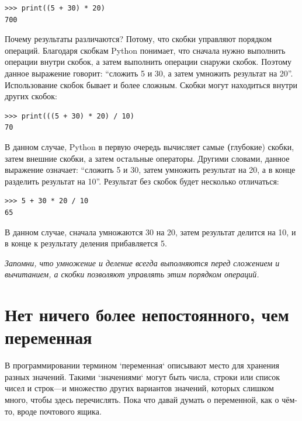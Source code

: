 \begin{listing}
\begin{verbatim}
>>> print((5 + 30) * 20)
700
\end{verbatim}
\end{listing}

\noindent
Почему результаты различаются? Потому, что скобки управляют порядком операций. Благодаря скобкам Python понимает, что сначала нужно выполнить операции внутри скобок, а затем выполнить операции снаружи скобок. Поэтому данное выражение говорит: ``сложить 5 и 30, а затем умножить результат на 20''.
Использование скобок бывает и более сложным. Скобки могут находиться внутри других скобок:

\begin{listing}
\begin{verbatim}
>>> print(((5 + 30) * 20) / 10)
70
\end{verbatim}
\end{listing}

\noindent
В данном случае, Python в первую очередь вычисляет самые \textbf(глубокие) скобки, затем внешние скобки, а затем остальные операторы. Другими словами, данное выражение означает: ``сложить 5 и 30, затем умножить результат на 20, а в конце разделить результат на 10''. Результат без скобок будет несколько отличаться:

\begin{listing}
\begin{verbatim}
>>> 5 + 30 * 20 / 10
65
\end{verbatim}
\end{listing}

В данном случае, сначала умножаются 30 на 20, затем результат делится на 10, и в конце к результату деления прибавляется 5.

\emph{Запомни, что умножение и деление всегда выполняются перед сложением и вычитанием, а скобки позволяют управлять этим порядком операций.}

\section{Нет ничего более непостоянного, чем переменная}

В программировании термином `переменная` описывают место для хранения разных значений. Такими `значениями` могут быть числа, строки или список чисел и строк---и множество других вариантов значений, которых слишком много, чтобы здесь перечислять.  Пока что давай думать о переменной, как о чём-то, вроде почтового ящика.

